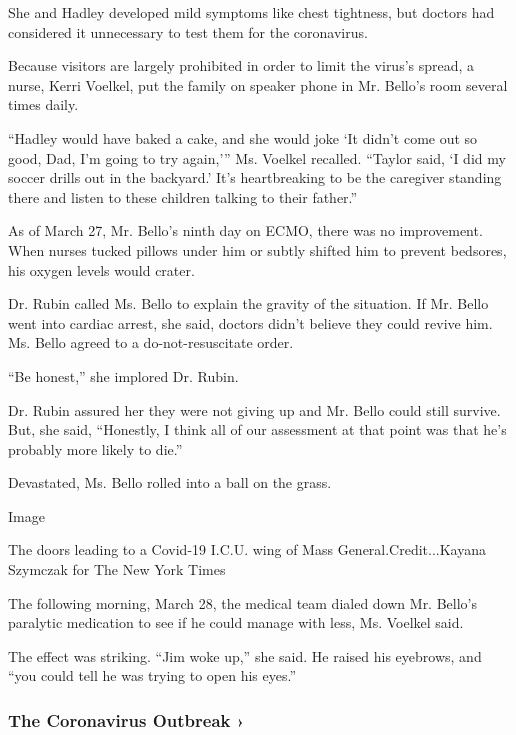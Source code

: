 She and Hadley developed mild symptoms like chest tightness, but doctors
had considered it unnecessary to test them for the coronavirus.

Because visitors are largely prohibited in order to limit the virus's
spread, a nurse, Kerri Voelkel, put the family on speaker phone in Mr.
Bello's room several times daily.

``Hadley would have baked a cake, and she would joke `It didn't come out
so good, Dad, I'm going to try again,''' Ms. Voelkel recalled. ``Taylor
said, `I did my soccer drills out in the backyard.' It's heartbreaking
to be the caregiver standing there and listen to these children talking
to their father.''

As of March 27, Mr. Bello's ninth day on ECMO, there was no improvement.
When nurses tucked pillows under him or subtly shifted him to prevent
bedsores, his oxygen levels would crater.

Dr. Rubin called Ms. Bello to explain the gravity of the situation. If
Mr. Bello went into cardiac arrest, she said, doctors didn't believe
they could revive him. Ms. Bello agreed to a do-not-resuscitate order.

``Be honest,'' she implored Dr. Rubin.

Dr. Rubin assured her they were not giving up and Mr. Bello could still
survive. But, she said, ``Honestly, I think all of our assessment at
that point was that he's probably more likely to die.''

Devastated, Ms. Bello rolled into a ball on the grass.

Image

The doors leading to a Covid-19 I.C.U. wing of Mass
General.Credit...Kayana Szymczak for The New York Times

The following morning, March 28, the medical team dialed down Mr.
Bello's paralytic medication to see if he could manage with less, Ms.
Voelkel said.

The effect was striking. ``Jim woke up,'' she said. He raised his
eyebrows, and ``you could tell he was trying to open his eyes.''

\href{https://www.nytimes3xbfgragh.onion/news-event/coronavirus?action=click\&pgtype=Article\&state=default\&region=MAIN_CONTENT_3\&context=storylines_faq}{}

\hypertarget{the-coronavirus-outbreak-}{%
\subsubsection{The Coronavirus Outbreak
›}\label{the-coronavirus-outbreak-}}


